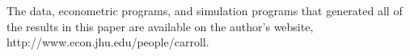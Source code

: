 The data, econometric programs, and simulation programs that generated 
all of the results in this paper are available on the author's 
website, http://www.econ.jhu.edu/people/carroll.
